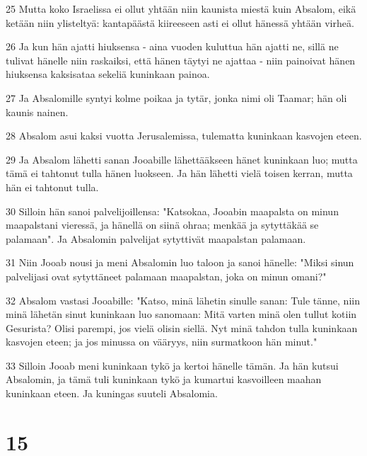 \par 25 Mutta koko Israelissa ei ollut yhtään niin kaunista miestä kuin Absalom, eikä ketään niin ylisteltyä: kantapäästä kiireeseen asti ei ollut hänessä yhtään virheä.
\par 26 Ja kun hän ajatti hiuksensa - aina vuoden kuluttua hän ajatti ne, sillä ne tulivat hänelle niin raskaiksi, että hänen täytyi ne ajattaa - niin painoivat hänen hiuksensa kaksisataa sekeliä kuninkaan painoa.
\par 27 Ja Absalomille syntyi kolme poikaa ja tytär, jonka nimi oli Taamar; hän oli kaunis nainen.
\par 28 Absalom asui kaksi vuotta Jerusalemissa, tulematta kuninkaan kasvojen eteen.
\par 29 Ja Absalom lähetti sanan Jooabille lähettääkseen hänet kuninkaan luo; mutta tämä ei tahtonut tulla hänen luokseen. Ja hän lähetti vielä toisen kerran, mutta hän ei tahtonut tulla.
\par 30 Silloin hän sanoi palvelijoillensa: "Katsokaa, Jooabin maapalsta on minun maapalstani vieressä, ja hänellä on siinä ohraa; menkää ja sytyttäkää se palamaan". Ja Absalomin palvelijat sytyttivät maapalstan palamaan.
\par 31 Niin Jooab nousi ja meni Absalomin luo taloon ja sanoi hänelle: "Miksi sinun palvelijasi ovat sytyttäneet palamaan maapalstan, joka on minun omani?"
\par 32 Absalom vastasi Jooabille: "Katso, minä lähetin sinulle sanan: Tule tänne, niin minä lähetän sinut kuninkaan luo sanomaan: Mitä varten minä olen tullut kotiin Gesurista? Olisi parempi, jos vielä olisin siellä. Nyt minä tahdon tulla kuninkaan kasvojen eteen; ja jos minussa on vääryys, niin surmatkoon hän minut."
\par 33 Silloin Jooab meni kuninkaan tykö ja kertoi hänelle tämän. Ja hän kutsui Absalomin, ja tämä tuli kuninkaan tykö ja kumartui kasvoilleen maahan kuninkaan eteen. Ja kuningas suuteli Absalomia.

\chapter{15}

